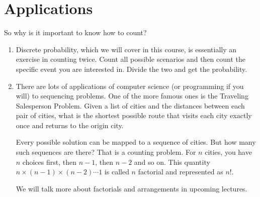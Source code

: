 \documentclass[12pt]{article}
\begin{document}
\section*{Applications}
So why is it important to know how to count?

\begin{enumerate}
\item Discrete probability, which we will cover in this course, is essentially an exercise in counting twice. Count all possible scenarios and then count the specific event you are interested in. Divide the two and get the probability.
\item There are lots of applications of computer science (or programming if you will) to sequencing problems. One of the more famous ones is the Traveling Salesperson Problem.  Given a list of cities and the distances between each pair of cities, what is the shortest possible route that visits each city exactly once and returns to the origin city. 

Every possible solution can be mapped to a sequence of cities. But how many such sequences are there? That is a counting problem. For $n$ cities, you have $n$ choices first, then $n-1$, then $n-2$ and so on. This quantity $n \times (n-1) \times (n-2) \cdots 1$ is called $n$ factorial and represented as $n!$. 

We will talk more about factorials and arrangements in upcoming lectures.

\end{enumerate}
\end{document}
